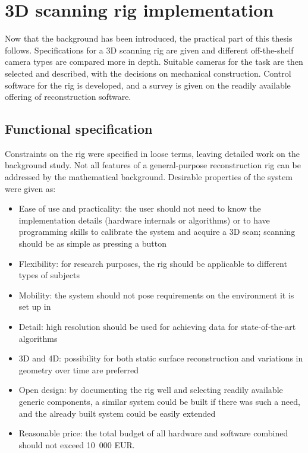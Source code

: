 \section{3D scanning rig implementation} \label{sec:implementation}

Now that the background has been introduced, the practical part of this thesis follows.
Specifications for a 3D scanning rig are given and different off-the-shelf camera types are compared more in depth.
Suitable cameras for the task are then selected and described, with the decisions on mechanical construction.
Control software for the rig is developed, and a survey is given on the readily available offering of reconstruction software.

\subsection{Functional specification} %

Constraints on the rig were specified in loose terms, leaving detailed work on the background study.
Not all features of a general-purpose reconstruction rig can be addressed by the mathematical background.
Desirable properties of the system were given as:

\begin{itemize}
	\item Ease of use and practicality: the user should not need to know the implementation details (hardware internals or algorithms) or to have programming skills to calibrate the system and acquire a 3D scan; scanning should be as simple as pressing a button
	\item Flexibility: for research purposes, the rig should be applicable to different types of subjects
	\item Mobility: the system should not pose requirements on the environment it is set up in
	\item Detail: high resolution should be used for achieving data for state-of-the-art algorithms
	\item 3D and 4D: possibility for both static surface reconstruction and variations in geometry over time are preferred
	\item Open design: by documenting the rig well and selecting readily available generic components, a similar system could be built if there was such a need, and the already built system could be easily extended
	\item Reasonable price: the total budget of all hardware and software combined should not exceed 10~000 EUR.%
\end{itemize}

